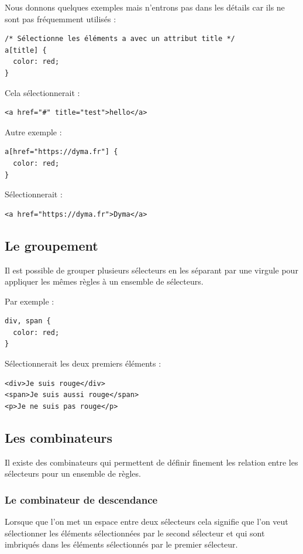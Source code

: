\documentclass[a4paper]{article}
\begin{document}
Nous donnons quelques exemples mais n'entrons pas dans les détails car ils ne sont pas fréquemment utilisés :
\begin{verbatim}
/* Sélectionne les éléments a avec un attribut title */
a[title] {
  color: red;
}
\end{verbatim}
Cela sélectionnerait :
\begin{verbatim}
<a href="#" title="test">hello</a>
\end{verbatim}
Autre exemple :
\begin{verbatim}
a[href="https://dyma.fr"] {
  color: red;
}
\end{verbatim}
Sélectionnerait :
\begin{verbatim}
<a href="https://dyma.fr">Dyma</a>
\end{verbatim}
\subsection{Le groupement}
Il est possible de grouper plusieurs sélecteurs en les séparant par une virgule pour appliquer les mêmes règles à un ensemble de sélecteurs.

Par exemple :
\begin{verbatim}
div, span {
  color: red;
}
\end{verbatim}
Sélectionnerait les deux premiers éléments :
\begin{verbatim}
<div>Je suis rouge</div>
<span>Je suis aussi rouge</span>
<p>Je ne suis pas rouge</p>
\end{verbatim}
\subsection{Les combinateurs}
Il existe des combinateurs qui permettent de définir finement les relation entre les sélecteurs pour un ensemble de règles.

\subsubsection{Le combinateur de descendance}
Lorsque que l'on met un espace entre deux sélecteurs cela signifie que l'on veut sélectionner les éléments sélectionnées par le second sélecteur et qui sont imbriqués dans les éléments sélectionnés par le premier sélecteur.
\end{document}
